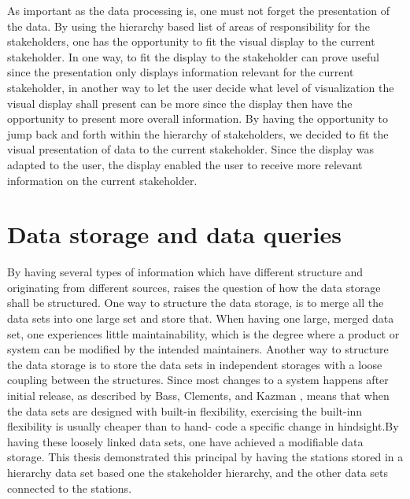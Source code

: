As important as the data processing is, one must not forget the presentation of
the data. By using the hierarchy based list of areas of responsibility for the
stakeholders, one has the opportunity to fit the visual display to the current
stakeholder. In one way, to fit the display to the stakeholder can prove 
useful since the presentation only displays information relevant for the 
current stakeholder, in another way to let the user decide what level of 
visualization the visual display shall present can be more since the display 
then have the opportunity to present more overall information. By having the 
opportunity to jump
back and forth within the hierarchy of stakeholders, we decided to fit the 
visual presentation of data to the current stakeholder. Since the display was 
adapted to the user, the display enabled the user to receive more relevant 
information on the current stakeholder.


\section{Data storage and data queries} %
\label{sec:discussion_data_storage_and_data_queries}
By having several types of information which have different structure and
originating from different sources, raises the question of how the data storage
shall be structured. One way to structure the data storage, is to merge all the
data sets into one large set and store that. When having one large, merged 
data set, one experiences little maintainability, which is the degree where a
product or system can be modified by the intended maintainers\cite[p. 195]{Bass:2012:SAP:2392670}.
Another way to structure the data storage is to store the data sets in
independent storages with a loose coupling between the structures. Since most 
changes to a system happens after initial release, as described by Bass, 
Clements, and Kazman \cite[pp. 117-124]{Bass:2012:SAP:2392670},
means that when the data sets are designed with built-in flexibility, 
exercising the built-inn flexibility is usually cheaper than to hand-
code a specific change in hindsight.By having these loosely linked data sets,
one have achieved a modifiable data storage. This thesis demonstrated this
principal by having the stations stored in a hierarchy data set based one the 
stakeholder hierarchy, and the other data sets connected to the stations.\\



